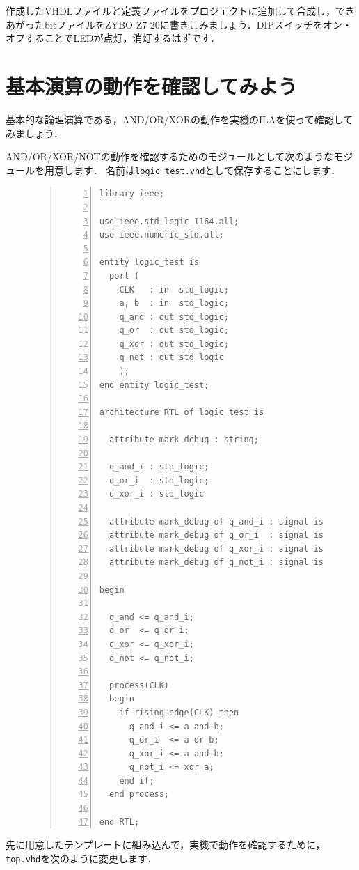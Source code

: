 \documentclass[a4paper,dvipdfmx]{jsarticle}
\begin{document}
作成したVHDLファイルと定義ファイルをプロジェクトに追加して合成し，できあがったbitファイルをZYBO Z7-20に書きこみましょう．DIPスイッチをオン・オフすることでLEDが点灯，消灯するはずです．

\section{基本演算の動作を確認してみよう}
基本的な論理演算である，AND/OR/XORの動作を実機のILAを使って確認してみましょう．

AND/OR/XOR/NOTの動作を確認するためのモジュールとして次のようなモジュールを用意します．
名前は\verb|logic_test.vhd|として保存することにします．
\begin{figure}[H]
\begin{quote}
\begin{Verbatim}[frame=single, numbers=left, baselinestretch=0.8]
library ieee;

use ieee.std_logic_1164.all;
use ieee.numeric_std.all;

entity logic_test is
  port (
    CLK   : in  std_logic;
    a, b  : in  std_logic;
    q_and : out std_logic;
    q_or  : out std_logic;
    q_xor : out std_logic;
    q_not : out std_logic
    );
end entity logic_test;

architecture RTL of logic_test is

  attribute mark_debug : string;

  q_and_i : std_logic;
  q_or_i  : std_logic;
  q_xor_i : std_logic

  attribute mark_debug of q_and_i : signal is "true";
  attribute mark_debug of q_or_i  : signal is "true";
  attribute mark_debug of q_xor_i : signal is "true";
  attribute mark_debug of q_not_i : signal is "true";
  
begin

  q_and <= q_and_i;
  q_or  <= q_or_i;
  q_xor <= q_xor_i;
  q_not <= q_not_i;

  process(CLK)
  begin
    if rising_edge(CLK) then
      q_and_i <= a and b;
      q_or_i  <= a or b;
      q_xor_i <= a and b;
      q_not_i <= xor a;
    end if;
  end process;
  
end RTL;
\end{Verbatim}
\end{quote}
\end{figure}

先に用意したテンプレートに組み込んで，実機で動作を確認するために，\verb|top.vhd|を次のように変更します．
\end{document}
